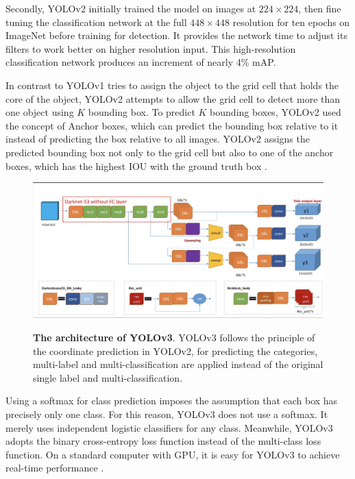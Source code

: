 Secondly, YOLOv2  \cite{ yolov2} initially trained the model on images at $224\times224$, then ﬁne tuning the classiﬁcation network at the full $448\times448$ resolution for ten epochs on ImageNet before training for detection.  It provides the network time to adjust its ﬁlters to work better on higher resolution input. This high-resolution classiﬁcation network produces an increment of nearly 4\% mAP\cite{yolov2}.

In contrast to YOLOv1 \cite{ yolov1} tries to assign the object to the grid cell that holds the core of the object,  YOLOv2 \cite{ yolov2} attempts to allow the grid cell to detect more than one object using  $K$ bounding box. To predict $ K$ bounding boxes, YOLOv2 used the concept of Anchor boxes\cite{ yolov2}, which can predict the bounding box relative to it instead of predicting the box relative to all images.   YOLOv2 assigns the predicted bounding box not only to the grid cell but also to one of the anchor boxes, which has the highest IOU with the ground truth box \cite{yolov2}. 


\begin{figure}[t]
\begin{center}
\centering
\includegraphics[width=\textwidth]{thesis-template-master/images/yolov3.png}
\label{fig:cellnet}

\end{center}
\caption{\textbf{The architecture of YOLOv3}. YOLOv3\cite{33} follows the principle of the coordinate prediction in YOLOv2\cite{yolov2}, for predicting the categories, multi-label and multi-classification are applied instead of the original single label and multi-classification.}
\end{figure}

Using a softmax for class prediction imposes the assumption that each box has precisely only one class. For this reason, YOLOv3 \cite{33} does not use a softmax. It merely uses independent logistic classiﬁers for any class. Meanwhile, YOLOv3\cite{33} adopts the binary cross-entropy loss function instead of the multi-class loss function. On a standard computer with GPU, it is easy for YOLOv3 to achieve real-time performance \cite{18}.  

